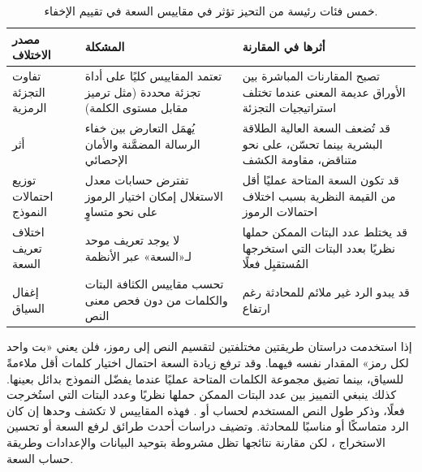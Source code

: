 \begin{table}[t]
  \centering
  \footnotesize
  \caption{خمس فئات رئيسة من التحيز تؤثر في مقاييس السعة في تقييم الإخفاء.}
  \label{tab:capacity_bias_categories}
  \begin{RTL}
  \begin{tabular}{|A{2cm}|A{4.5cm}|A{5cm}|}
    \hline
    \textbf{مصدر الاختلاف}       & \textbf{المشكلة}                                                           & \textbf{أثرها في المقارنة}                                                              \\
    \hline
    تفاوت التجزئة الرمزية & تعتمد المقاييس كليًا على أداة تجزئة محددة (مثل ترميز  مقابل مستوى الكلمة) & تصبح المقارنات المباشرة بين الأوراق عديمة المعنى عندما تختلف استراتيجيات التجزئة    \\
    \hline
    أثر               & يُهمَل التعارض بين خفاء الرسالة المضمَّنة والأمان الإحصائي        & قد تُضعف السعة العالية الطلاقة البشرية بينما تحسّن، على نحو متناقض، مقاومة الكشف \\
    \hline
    توزيع احتمالات النموذج          & تفترض حسابات معدل الاستغلال إمكان اختيار الرموز على نحو متساوٍ                 & قد تكون السعة المتاحة عمليًا أقل من القيمة النظرية بسبب اختلاف احتمالات الرموز \\
    \hline
    اختلاف تعريف السعة        & لا يوجد تعريف موحد لـ«السعة» عبر الأنظمة                          & قد يختلط عدد البتات الممكن حملها نظريًا بعدد البتات التي استخرجها المُستقبِل فعلًا    \\
    \hline
    إغفال السياق            & تحسب مقاييس الكثافة البتات والكلمات من دون فحص معنى النص                            & قد يبدو الرد غير ملائم للمحادثة رغم ارتفاع          \\
    \hline
  \end{tabular}
  \end{RTL}
\end{table}

إذا استخدمت دراستان طريقتين مختلفتين لتقسيم النص إلى رموز، فلن يعني «بت واحد لكل رمز» المقدار نفسه فيهما. وقد ترفع زيادة السعة احتمال اختيار كلمات أقل ملاءمةً للسياق، بينما تضيق مجموعة الكلمات المتاحة عمليًا عندما يفضّل النموذج بدائل بعينها. كذلك ينبغي التمييز بين عدد البتات الممكن حملها نظريًا وعدد البتات التي استُخرجت فعلًا، وذكر طول النص المستخدم لحساب  أو . فهذه المقاييس لا تكشف وحدها إن كان الرد متماسكًا أو مناسبًا للمحادثة. وتضيف دراسات أحدث طرائق لرفع السعة أو تحسين الاستخراج \cite{kuznetsov2025deepstego,wozniak2025multicriteria}، لكن مقارنة نتائجها تظل مشروطة بتوحيد البيانات والإعدادات وطريقة حساب السعة.

